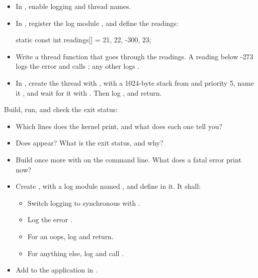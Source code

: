 \begin{itemize}
  \item In , enable logging and thread names.
  \item In , register the log module , and define the readings:
\begin{ccode}
static const int readings[] = {21, 22, -300, 23};
\end{ccode}
  \item Write a thread function  that goes through the readings. A reading below -273 logs
    the error  and calls ; any other logs .
  \item In , create the thread with , with a 1024-byte stack from
     and priority 5, name it , and wait for it with
    . Then log , and return.
\end{itemize}

Build, run, and check the exit status:


\begin{itemize}
  \item Which lines does the kernel print, and what does each one tell you?
  \item Does  appear? What is the exit status, and why?
  \item Build once more with  on the command line. What does a fatal error print now?
\end{itemize}

\label{c6:ex:3.2}

\begin{itemize}
  \item Create , with a log module named , and define
     in it. It shall:
\begin{itemize}
  \item Switch logging to synchronous with .
  \item Log the error .
  \item For an oops, log  and return.
  \item For anything else, log  and call .
\end{itemize}
  \item Add  to the application in .
\end{itemize}

